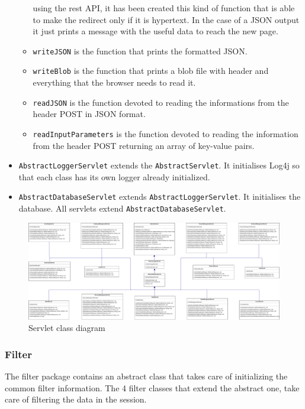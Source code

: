 \begin{itemize}
\begin{itemize}
        using the rest API, it has been created this kind of function that is able to make
        the redirect only if it is hypertext. In the case of a JSON output it just
        prints a message with the useful data to reach the new page.
        \item \texttt{writeJSON} is the function that prints the formatted JSON.
        \item \texttt{writeBlob} is the function that prints a blob file with
        header and everything that the browser needs to read it.
        \item \texttt{readJSON}  is the function devoted to reading the informations
        from the header POST in JSON format.
        \item \texttt{readInputParameters} is the function devoted to reading the
        information from the header POST returning an array of key-value pairs.
    \end{itemize}
    \item \texttt{AbstractLoggerServlet} extends the \texttt{AbstractServlet}. It initialises Log4j
    so that each class has its own logger already initialized.
    \item \texttt{AbstractDatabaseServlet} extends \texttt{AbstractLoggerServlet}. It initialises the database.
    All servlets extend \texttt{AbstractDatabaseServlet}.
\end{itemize}


\begin{figure}
    \centering
    \includegraphics[width=1.1\textwidth,height=\textheight,keepaspectratio]{Schemas/servlet.drawio.pdf}
    \caption{Servlet class diagram}
    \label{fig:ServletClassDiagram}
\end{figure}

\subsubsection*{Filter}

    
The filter package contains an abstract class that takes care of
initializing the common filter information. The 4 filter classes that
extend the abstract one, take care of filtering the data in the session.


